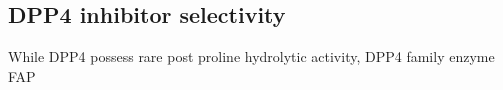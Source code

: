 \subsection{DPP4 inhibitor selectivity}
While DPP4 possess rare post proline hydrolytic activity, DPP4 family enzyme FAP
